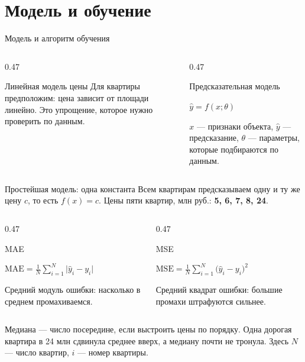 \section{Модель и обучение}

\begin{frame}[c]{Модель и алгоритм обучения}
  \begin{columns}[T]
    \begin{column}{0.47\textwidth}
      \begin{block}{Линейная модель цены}
        Для квартиры предположим: цена зависит от площади линейно. Это упрощение, которое нужно проверить по данным.
      \end{block}
    \end{column}
    \begin{column}{0.47\textwidth}
      \begin{block}{Предсказательная модель}
        \small
        \centerline{$\widehat y=f(x;\theta)$}
        \smallskip
        $x$ --- признаки объекта, $\widehat y$ --- предсказание, $\theta$ --- параметры, которые подбираются по данным.
      \end{block}
    \end{column}
  \end{columns}
\end{frame}

\begin{frame}[c]{Простейшая модель: одна константа}
  \small Всем квартирам предсказываем одну и ту же цену $c$, то есть $f(x)=c$.
  Цены пяти квартир, млн руб.: \textbf{5, 6, 7, 8, 24}.

  \smallskip
  \begin{columns}[T]
    \begin{column}{0.47\textwidth}
      \begin{block}{MAE}
        \centerline{$\displaystyle \mathrm{MAE}=\frac1N\sum_{i=1}^{N}\lvert \widehat y_i-y_i\rvert$}
        \smallskip
        Средний модуль ошибки: насколько в среднем промахиваемся.

        \smallskip
      \end{block}
    \end{column}
    \begin{column}{0.47\textwidth}
      \begin{block}{MSE}
        \centerline{$\displaystyle \mathrm{MSE}=\frac1N\sum_{i=1}^{N}\bigl(\widehat y_i-y_i\bigr)^2$}
        \smallskip
        Средний квадрат ошибки: большие промахи штрафуются сильнее.

        \smallskip
      \end{block}
    \end{column}
  \end{columns}

  \medskip
  {\footnotesize\color{acGray}
  Медиана --- число посередине, если выстроить цены по порядку. Одна дорогая квартира в 24 млн
  сдвинула среднее вверх, а медиану почти не тронула. Здесь $N$ --- число квартир, $i$ --- номер квартиры.\par}
\end{frame}

